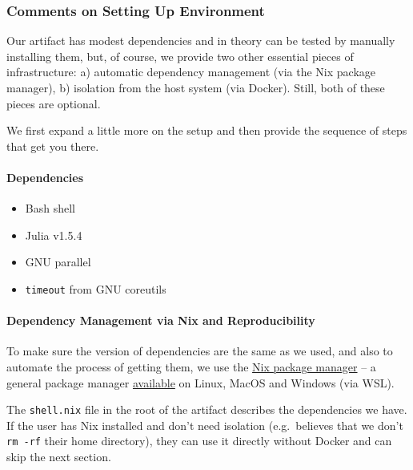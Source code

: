 \documentclass[
]{article}
\begin{document}
\hypertarget{comments-on-setting-up-environment}{%
\subsubsection{Comments on Setting Up
Environment}\label{comments-on-setting-up-environment}}

Our artifact has modest dependencies and in theory can be tested by
manually installing them, but, of course, we provide two other essential
pieces of infrastructure: a) automatic dependency management (via the
Nix package manager), b) isolation from the host system (via Docker).
Still, both of these pieces are optional.

We first expand a little more on the setup and then provide the sequence
of steps that get you there.

\hypertarget{dependencies}{%
\paragraph{Dependencies}\label{dependencies}}

\begin{itemize}
\item
  Bash shell
\item
  Julia v1.5.4
\item
  GNU parallel
\item
  \texttt{timeout} from GNU coreutils
\end{itemize}

\hypertarget{dependency-management-via-nix-and-reproducibility}{%
\paragraph{Dependency Management via Nix and
Reproducibility}\label{dependency-management-via-nix-and-reproducibility}}

To make sure the version of dependencies are the same as we used, and
also to automate the process of getting them, we use the
\href{https://nixos.org/manual/nix/stable/\#chap-introduction}{Nix
package manager} -- a general package manager
\href{https://nixos.org/guides/install-nix.html}{available} on Linux,
MacOS and Windows (via WSL).

The \texttt{shell.nix} file in the root of the artifact describes the
dependencies we have. If the user has Nix installed and don't need
isolation (e.g.~believes that we don't \texttt{rm\ -rf} their home
directory), they can use it directly without Docker and can skip the
next section.
\end{document}
